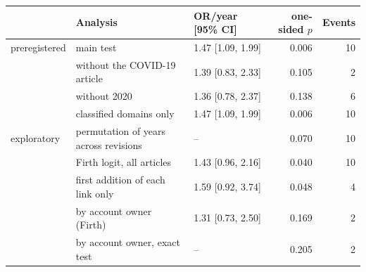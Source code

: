 \begin{tabular}{lllrr}
\toprule
 & Analysis & OR/year [95\% CI] & one-sided $p$ & Events \\
\midrule
preregistered & main test & 1.47 [1.09, 1.99] & 0.006 & 10 \\
 & without the COVID-19 article & 1.39 [0.83, 2.33] & 0.105 & 2 \\
 & without 2020 & 1.36 [0.78, 2.37] & 0.138 & 6 \\
 & classified domains only & 1.47 [1.09, 1.99] & 0.006 & 10 \\
\midrule
exploratory & permutation of years across revisions & -- & 0.070 & 10 \\
 & Firth logit, all articles & 1.43 [0.96, 2.16] & 0.040 & 10 \\
 & first addition of each link only & 1.59 [0.92, 3.74] & 0.048 & 4 \\
 & by account owner (Firth) & 1.31 [0.73, 2.50] & 0.169 & 2 \\
 & by account owner, exact test & -- & 0.205 & 2 \\
\bottomrule
\end{tabular}
